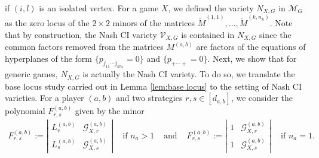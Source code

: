 \documentclass[11pt]{amsart}
\numberwithin{equation}{section}
\theoremstyle{plain}
\numberwithin{theorem}{section}
\theoremstyle{definition}
\newcommand{\Vc}{{\mathcal V}_{X,G}}
\begin{document}
if $(i,l)$ is an isolated vertex.
 For a game $X$, we defined the variety $N_{X,G}$ in $\mathcal{M}_G$ as the zero locus of the $2\times2$ minors of the matrices $\widetilde{M}^{(1,1)},\ldots,\widetilde{M}^{(k,n_k)}$. Note that by construction, the Nash CI variety $\Vc$  is contained in $N_{X,G}$ since the common factors removed from the matrices $M^{(a,b)}$ are factors of the equations of hyperplanes of the form $\{p_{j_{11}\cdots j_{kn_k}}=0\}$ and $\{p_{+\cdots +}=0\}$. Next, we show that for generic games, $N_{X,G}$ is actually the Nash CI variety. To do so, we translate the base locus study carried out in Lemma \ref{lem:base locus} to the setting of Nash CI varieties. For a player $(a,b)$ and two strategies $r,s\in[d_{a,b}]$, we consider the polynomial $F^{(a,b)}_{r,s}$ given by the minor 
 \[ \begin{array}{ccccc}
F^{(a,b)}_{r,s}:=\left| 
\begin{array}{cc}
L^{(a,b)}_{r}& \mathcal G^{(a,b)}_{X,r} \\
L^{(a,b)}_{s}& \mathcal G^{(a,b)}_{X,s}
\end{array}
\right| 
&\text{ if }n_a>1& \text{ and } &
F^{(a,b)}_{r,s}:=\left| 
\begin{array}{cc}
1& \mathcal G^{(a,b)}_{X,r} \\
1& \mathcal G^{(a,b)}_{X,s}
\end{array}
\right| &\text{ if }n_a=1.
\end{array}
 \]
\end{document}
